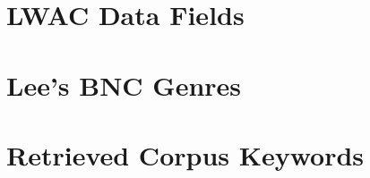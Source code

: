 

\section{LWAC Data Fields}
\label{sec:appx:fields}



\pagebreak
\section{Lee's BNC Genres}
\label{sec:appx:sample}



\pagebreak
\section{Retrieved Corpus Keywords}
\label{sec:appx:keywords}





